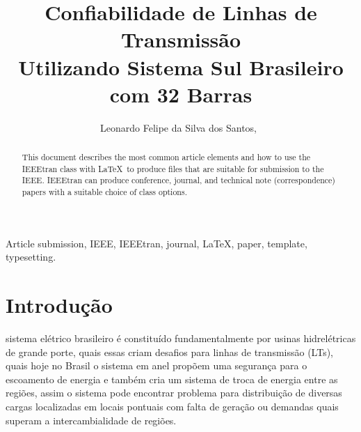 \documentclass[lettersize,journal]{IEEEtran}
\begin{document}
\title{Confiabilidade de Linhas de Transmissão\\ Utilizando Sistema Sul Brasileiro \\ com 32 Barras}

\author{Leonardo Felipe da Silva dos Santos,~\\ }



\maketitle

\begin{abstract}
This document describes the most common article elements and how to use the IEEEtran class with \LaTeX \ to produce files that are suitable for submission to the IEEE.  IEEEtran can produce conference, journal, and technical note (correspondence) papers with a suitable choice of class options. 
\end{abstract}

\begin{IEEEkeywords}
Article submission, IEEE, IEEEtran, journal, \LaTeX, paper, template, typesetting.
\end{IEEEkeywords}

\section{Introdução}
 sistema elétrico brasileiro é constituído fundamentalmente por usinas hidrelétricas de grande porte, quais essas criam desafios para linhas de transmissão (LTs), quais hoje no Brasil o sistema em anel propõem uma segurança para o escoamento de energia e também cria um sistema de troca de energia entre as regiões, assim o sistema pode encontrar problema para distribuição de diversas cargas localizadas em locais pontuais com falta de geração ou demandas quais superam a intercambialidade de regiões.
\end{document}
